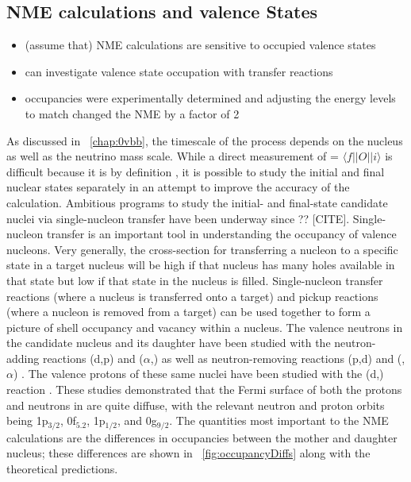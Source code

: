\subsection{NME calculations and valence States}
\begin{itemize}
\item (assume that) NME calculations are sensitive to occupied valence states
\item can investigate valence state occupation with transfer reactions
\item {} occupancies were experimentally determined and adjusting the energy levels to match changed the NME by a factor of 2 \cite{0vbbReview}
\end{itemize}
As discussed in {\chap}~\ref{chap:0vbb}, the timescale of the \zvbb process depends on the nucleus as well as the neutrino mass scale.  While a direct measurement of \NME = $\langle f||O||i \rangle$ is difficult because it is by definition \zvbb, it is possible to study the initial and final nuclear states separately in an attempt to improve the accuracy of the calculation.  Ambitious programs to study the initial- and final-state candidate nuclei via single-nucleon transfer have been underway since ?? [CITE].  Single-nucleon transfer is an important tool in understanding the occupancy of valence nucleons.  Very generally, the cross-section for transferring a nucleon to a specific state in a target nucleus will be high if that nucleus has many holes available in that state but low if that state in the nucleus is filled.  Single-nucleon transfer reactions (where a nucleus is transferred onto a target) and pickup reactions (where a nucleon is removed from a target) can be used together to form a picture of shell occupancy and vacancy within a nucleus.  The valence neutrons in the candidate nucleus \GeTargets and its daughter \SeProducts have been studied with the neutron-adding reactions (d,p) and ($\alpha$,) as well as neutron-removing reactions (p,d) and (,$\alpha$) \cite{valenceNeutrons}.  The valence protons of these same nuclei have been studied with the (d,) reaction \cite{valenceProtons}.  These studies demonstrated that the Fermi surface of both the protons and neutrons in \GeTargets are quite diffuse, with the relevant neutron and proton orbits being 1p$_{3/2}$, 0f$_{5.2}$, 1p$_{1/2}$, and 0g$_{9/2}$.  The quantities most important to the NME calculations are the differences in occupancies between the mother and daughter nucleus; these differences are shown in {\fig}~\ref{fig:occupancyDiffs} along with the theoretical predictions.
